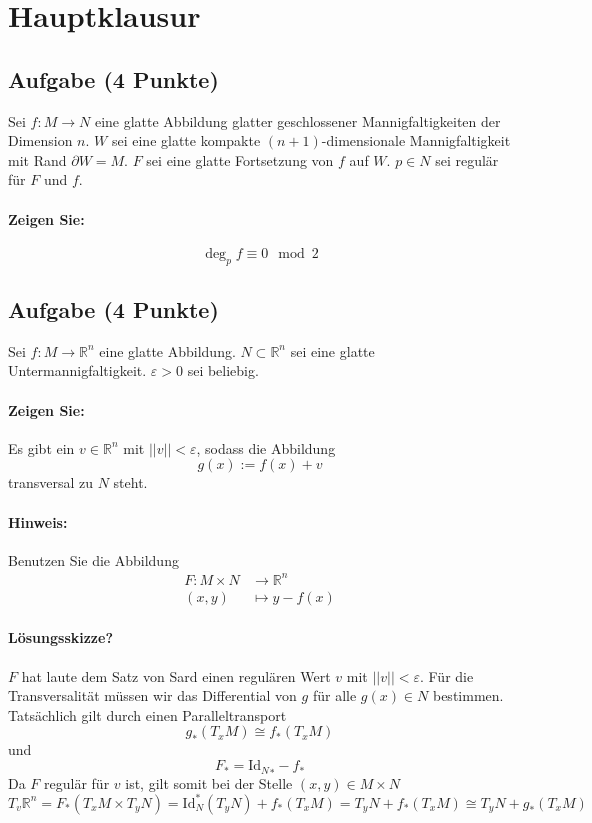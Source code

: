 \documentclass[12pt]{article}
\newcommand{\bet}[1]{\left|#1\right|}
\newcommand{\norm}[1]{\bet{\bet{#1}}}
\newcommand{\R}{\mathbb{R}}
\newcommand{\id}[1]{\text{Id}_{#1}}
\newcommand{\e}{\varepsilon}
\newcommand{\Pfeil}[1]{\overset{#1}{\longrightarrow}}
\newcommand{\pfeil}[1]{\overset{#1}{\rightarrow}}
\newcommand{\isom}[1]{\overset{#1}{\cong}}
\renewcommand{\epsilon}{\varepsilon}
\begin{document}
\section{Hauptklausur}
\subsection{Aufgabe (4 Punkte)}
Sei $f :M \pfeil{} N$ eine glatte Abbildung glatter geschlossener Mannigfaltigkeiten der Dimension $n$. $W$ sei eine glatte kompakte $(n+1)$-dimensionale Mannigfaltigkeit mit Rand $\partial W = M$. $F$ sei eine glatte Fortsetzung von $f$ auf $W$. $p \in N$ sei regulär für $F$ und $f$.
\paragraph{Zeigen Sie:}
\[ \deg_p f \equiv 0 \mod 2 \]

\subsection{Aufgabe (4 Punkte)}
Sei $f :M \pfeil{} \R^n$ eine glatte Abbildung. $N\subset \R^n$ sei eine glatte Untermannigfaltigkeit. $\epsilon > 0$ sei beliebig.
\paragraph{Zeigen Sie:} Es gibt ein $v \in \R^n$ mit $\norm{v} < \epsilon$, sodass die Abbildung
\[ g(x) := f(x) + v \]
transversal zu $N$ steht.
\paragraph{Hinweis:} Benutzen Sie die Abbildung
\begin{align*}
F: M\times N &\Pfeil{} \R^n\\
(x,y) & \longmapsto y - f(x)
\end{align*}
\paragraph{Lösungsskizze?}
$F$ hat laute dem Satz von Sard einen regulären Wert $v$ mit $\norm{v} < \e$. Für die Transversalität müssen wir das Differential von $g$ für alle $g(x) \in N$ bestimmen. Tatsächlich gilt durch einen Paralleltransport
\[ g_*(T_xM) \isom{} f_*(T_xM) \]
und
\[ F_*  = {\id{N}}_* - f_* \]
Da $F$ regulär für $v$ ist, gilt somit bei der Stelle $(x,y) \in M\times N$
\[ T_v\R^n = F_*(T_xM \times T_yN) = \id{N}^*(T_yN) + f_*(T_xM) = T_yN +f_*(T_xM) \isom{} T_yN + g_*(T_xM) \]
\end{document}
